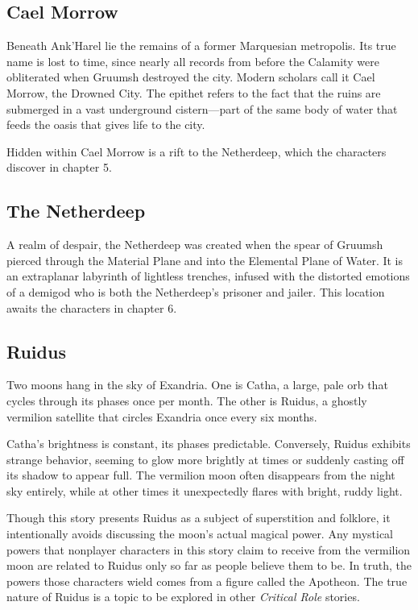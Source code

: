 \documentclass[10pt,a4paper,twoside,fancy,bg=print,twocolumn,openany,nodeprecatedcode]{dndbook}
\begin{document}
\subsection{Cael Morrow}
Beneath Ank'Harel lie the remains of a former Marquesian metropolis. Its true name is lost to time, since nearly all records from before the Calamity were obliterated when Gruumsh destroyed the city. Modern scholars call it Cael Morrow, the Drowned City. The epithet refers to the fact that the ruins are submerged in a vast underground cistern—part of the same body of water that feeds the oasis that gives life to the city.

Hidden within Cael Morrow is a rift to the Netherdeep, which the characters discover in chapter 5.

\subsection{The Netherdeep}
A realm of despair, the Netherdeep was created when the spear of Gruumsh pierced through the Material Plane and into the Elemental Plane of Water. It is an extraplanar labyrinth of lightless trenches, infused with the distorted emotions of a demigod who is both the Netherdeep's prisoner and jailer. This location awaits the characters in chapter 6.

\subsection{Ruidus}
Two moons hang in the sky of Exandria. One is Catha, a large, pale orb that cycles through its phases once per month. The other is Ruidus, a ghostly vermilion satellite that circles Exandria once every six months.

Catha's brightness is constant, its phases predictable. Conversely, Ruidus exhibits strange behavior, seeming to glow more brightly at times or suddenly casting off its shadow to appear full. The vermilion moon often disappears from the night sky entirely, while at other times it unexpectedly flares with bright, ruddy light.

Though this story presents Ruidus as a subject of superstition and folklore, it intentionally avoids discussing the moon's actual magical power. Any mystical powers that nonplayer characters in this story claim to receive from the vermilion moon are related to Ruidus only so far as people believe them to be. In truth, the powers those characters wield comes from a figure called the Apotheon. The true nature of Ruidus is a topic to be explored in other \textit{Critical Role} stories.
\end{document}
